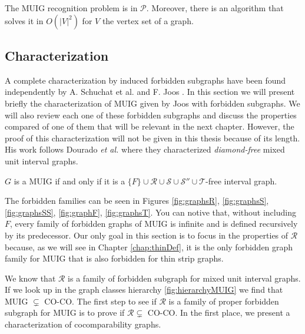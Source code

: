 \begin{theorem}
 The MUIG recognition problem is in $\mathcal{P}$. Moreover, there is an algorithm that solves it in $O(|V|^2)$ for $V$ the vertex set of a graph.
\end{theorem}


\subsection{Characterization}
\label{sec:muig_char}

A complete characterization by induced forbidden subgraphs have been found independently by A. Schuchat et al. \cite{shuchatUnitMixedInterval2014a} and F. Joos \cite{joosCharacterizationMixedUnit2013}. In this section we will present briefly the characterization of MUIG given by Joos with forbidden subgraphs. We will also review each one of these forbidden subgraphs and discuss the properties compared of one of them that will be relevant in the next chapter. However, the proof of this characterization will not be given in this thesis because of its length. His work follows Dourado \textit{et al.} \cite{douradoMixedUnitInterval2012} where they characterized \emph{diamond-free} mixed unit interval graphs.

\begin{theorem}
  $G$ is a MUIG if and only if it is a $\{F\}\cup\mathcal{R}\cup\mathcal{S}\cup\mathcal{S''}\cup\mathcal{T}$-free interval graph.
\end{theorem}

The forbidden families can be seen in Figures \ref{fig:graphsR}, \ref{fig:graphsS}, \ref{fig:graphsSS}, \ref{fig:graphF}, \ref{fig:graphsT}. You can notive that, without including $F$, every family of forbidden graphs of MUIG is infinite and is defined recursively by its predecessor. Our only goal in this section is to focus in the properties of $\mathcal{R}$ because, as we will see in Chapter \ref{chap:thinDef}, it is the only forbidden graph family for MUIG that is also forbidden for thin strip graphs.

We know that $\mathcal{R}$ is a family of forbidden subgraph for mixed unit interval graphs. If we look up in the graph classes hierarchy \ref{fig:hierarchyMUIG} we find that MUIG $\subsetneq$ CO-CO. The first step to see if $\mathcal{R}$ is a family of proper forbidden subgraph for MUIG is to prove if $\mathcal{R} \subsetneq$ CO-CO. In the first place, we present a characterization of cocomparability graphs.

